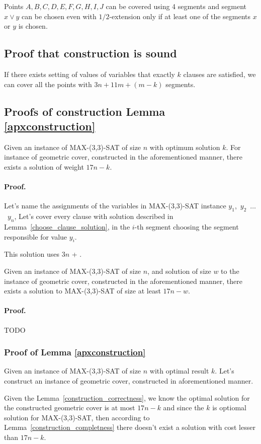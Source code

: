 \begin{lemma}
Points $A, B, C, D, E, F, G, H, I, J$ can be covered using
4 segments and segment $x \lor y$ can be chosen
even with $1/2$-extension
only if at least one of the segments $x$ or $y$ is chosen.
\end{lemma}

\subsection{Proof that construction is sound}
\begin{lemma}
If there exists setting of values of variables that exactly $k$
clauses are satisfied, we can cover all the points
with $3n + 11m + (m-k)$ segments.
\end{lemma}


\subsection{Proofs of construction Lemma \ref{apxconstruction}}
\begin{lemma}
	\label{construction_correctness}
	Given an instance of MAX-(3,3)-SAT of size $n$ with optimum solution $k$.
	For instance of geometric cover, constructed
	in the aforementioned manner, 
	there exists a solution of weight $17n - k$.
\end{lemma}
\paragraph{Proof.}
Let's name the assignments of the variables in MAX-(3,3)-SAT
instance $y_1$,~$y_2$~$\ldots$~$y_n$,
Let's cover every clause with solution described in Lemma~\ref{choose_clause_solution},
in the $i$-th segment choosing the segment responsible for value $y_i$.



This solution uses $3n$ + .

\begin{lemma}
	\label{construction_completness}
	Given an instance of MAX-(3,3)-SAT of size $n$,
	and solution of size $w$ to the instance of geometric cover, constructed
	in the aforementioned manner, 
	there exists a solution to MAX-(3,3)-SAT of size at least $17n - w$.
\end{lemma}
\paragraph{Proof.}
TODO

\subsubsection{Proof of Lemma \ref{apxconstruction}}
Given an instance of MAX-(3,3)-SAT of size $n$
with optimal result $k$.
Let's construct an instance of geometric cover,
constructed in aforementioned manner.

Given the Lemma~\ref{construction_correctness}, we know
the optimal solution for the constructed geometric cover is
at most $17n - k$ and since the $k$ is optiomal solution
for MAX-(3,3)-SAT, then according to Lemma~\ref{construction_completness}
there doesn't exist a solution with cost lesser than $17n - k$.
